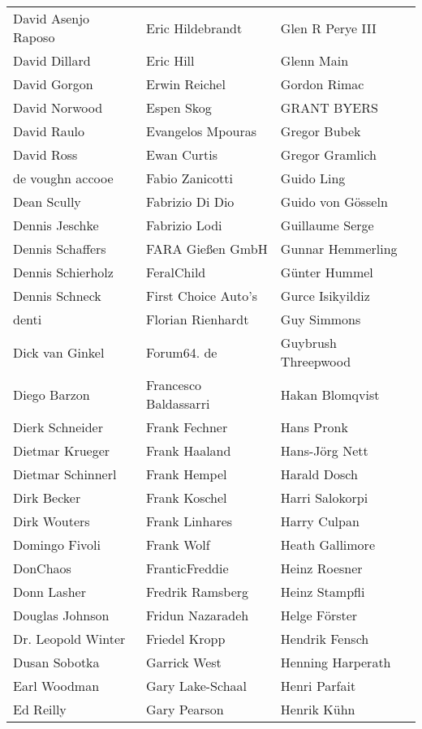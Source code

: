 \begin{tabular}{p{4.5cm}p{4.5cm}p{4.5cm}}
David Asenjo Raposo & Eric Hildebrandt & Glen R Perye III \\
David Dillard & Eric Hill & Glenn Main \\
David Gorgon & Erwin Reichel & Gordon Rimac \\
David Norwood & Espen Skog & GRANT BYERS \\
David Raulo & Evangelos Mpouras & Gregor Bubek \\
David Ross & Ewan Curtis & Gregor Gramlich \\
de voughn accooe & Fabio Zanicotti & Guido Ling \\
Dean Scully & Fabrizio Di Dio & Guido von Gösseln \\
Dennis Jeschke & Fabrizio Lodi & Guillaume Serge \\
Dennis Schaffers & FARA Gießen GmbH & Gunnar Hemmerling \\
Dennis Schierholz & FeralChild & Günter Hummel \\
Dennis Schneck & First Choice Auto's & Gurce Isikyildiz \\
denti & Florian Rienhardt & Guy Simmons \\
Dick van Ginkel & Forum64. de & Guybrush Threepwood \\
Diego Barzon & Francesco Baldassarri & Hakan Blomqvist \\
Dierk Schneider & Frank Fechner & Hans Pronk \\
Dietmar Krueger & Frank Haaland & Hans-Jörg Nett \\
Dietmar Schinnerl & Frank Hempel & Harald Dosch \\
Dirk Becker & Frank Koschel & Harri Salokorpi \\
Dirk Wouters & Frank Linhares & Harry Culpan \\
Domingo Fivoli & Frank Wolf & Heath Gallimore \\
DonChaos & FranticFreddie & Heinz Roesner \\
Donn Lasher & Fredrik Ramsberg & Heinz Stampfli \\
Douglas Johnson & Fridun Nazaradeh & Helge Förster \\
Dr. Leopold Winter & Friedel Kropp & Hendrik Fensch \\
Dusan Sobotka & Garrick West & Henning Harperath \\
Earl Woodman & Gary Lake-Schaal & Henri Parfait \\
Ed Reilly & Gary Pearson & Henrik Kühn \\

\end{tabular}
